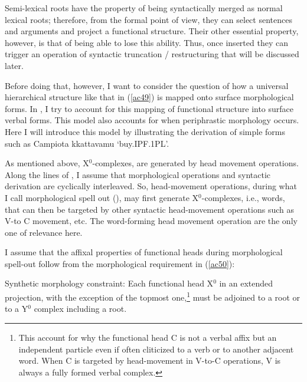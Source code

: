 \documentclass[output=paper]{langscibook}
\begin{document}
Semi-lexical roots have the property of being syntactically merged as normal lexical roots; therefore, from the formal point of view, they can select sentences and arguments and project a functional structure.  Their other essential property, however, is that of being able to lose this ability. Thus, once inserted they can trigger an operation of syntactic truncation / restructuring that will be discussed later. 

Before doing that, however, I want to consider  the question of how a universal hierarchical structure like that in (\ref{ac49}) is mapped onto surface morphological forms. In \citet{calabrese2019a}, I try to account for this mapping of functional structure into surface verbal forms. This model also accounts for when periphrastic morphology occurs. Here I will introduce this model by illustrating the derivation of simple forms such as Campiota kkattavamu ‘buy.IPF.1PL’.

As mentioned above, X$^0$-complexes, are generated by head movement operations. Along the lines of \citet{calabrese2014a}, I assume that morphological operations and syntactic derivation are cyclically interleaved. So, head-movement operations, during what I call morphological spell out (\cite{calabrese2019a}), may first generate X$^0$-complexes, i.e., words, that can then be targeted by other syntactic head-movement operations such as V-to C movement, etc. The word-forming head movement operation are the only one of relevance here.  

I assume that the affixal properties of functional heads during morphological spell-out follow from the morphological requirement in (\ref{ac50}):

\ea \label{ac50}Synthetic morphology constraint:       
Each functional head X$^0$ in an extended projection, with the exception of the topmost one,\footnote{This account for why the functional head C is not a verbal affix but an independent particle even if often cliticized to a verb or to another adjacent word.  When C is targeted by head-movement in V-to-C operations, V is always a fully formed verbal complex.} must be adjoined to a root or to a Y$^0$ complex including a root.
\z
\end{document}
